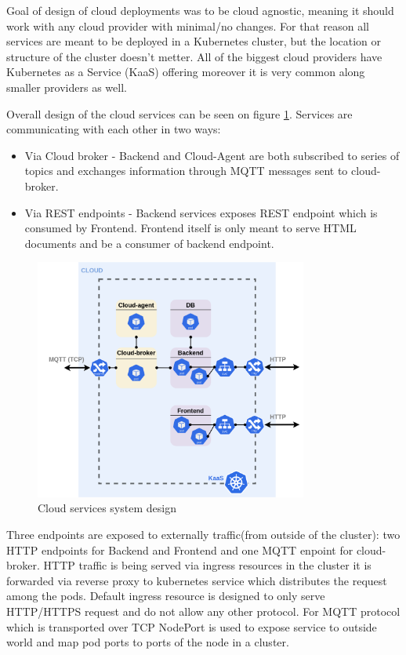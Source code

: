 Goal of design of cloud deployments was to be cloud agnostic, meaning it should work with any cloud provider with minimal/no changes. For that reason all services are meant to be deployed in a Kubernetes cluster, but the location or structure of the cluster doesn't metter. All of the biggest cloud providers have Kubernetes as a Service (KaaS) offering moreover it is very common along smaller providers as well.

Overall design of the cloud services can be seen on figure \ref{fig:cloud_services}. Services are communicating with each other in two ways:
\begin{itemize}
    \item Via Cloud broker - Backend and Cloud-Agent are both subscribed to series of topics and exchanges information through MQTT messages sent to cloud-broker. 
    \item Via REST endpoints - Backend services exposes REST endpoint which is consumed by Frontend. Frontend itself is only meant to serve HTML documents and be a consumer of backend endpoint.
\end{itemize}

\begin{figure}[H]
    \centering
    \includegraphics[width=0.8\textwidth]{pictures/cloud_services.png}
    \caption{ Cloud services system design }
    \label{fig:cloud_services}
\end{figure}

Three endpoints are exposed to externally traffic(from outside of the cluster): two HTTP endpoints for Backend and Frontend and one MQTT enpoint for cloud-broker.
HTTP traffic is being served via ingress resources in the cluster it is forwarded via reverse proxy to kubernetes service which distributes the request among the pods. Default ingress resource is designed to only serve HTTP/HTTPS request and do not allow any other protocol. For MQTT protocol which is transported over TCP NodePort is used to expose service to outside world and map pod ports to ports of the node in a cluster.